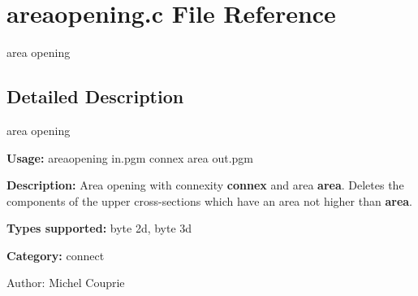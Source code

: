 \section{areaopening.c File Reference}
\label{areaopening_8c}
area opening 



\subsection{Detailed Description}
area opening 

{\bf Usage:} areaopening in.pgm connex area out.pgm

{\bf Description:} Area opening with connexity {\bf connex} and area {\bf area}. Deletes the components of the upper cross-sections which have an area not higher than {\bf area}.

{\bf Types supported:} byte 2d, byte 3d

{\bf Category:} connect

\begin{Desc}
\item[Author:]Michel Couprie \end{Desc}

